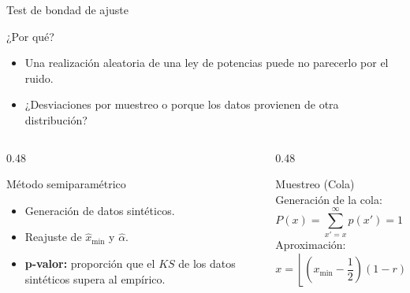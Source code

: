 \documentclass[aspectratio=169, 11pt, xcolor=table]{beamer}
\begin{document}
	\begin{frame}{Test de bondad de ajuste}
		\begin{block}{¿Por qué?}
			\begin{itemize}
				\item Una realización aleatoria de una ley de potencias puede no parecerlo por el ruido.
				\item ¿Desviaciones por muestreo o porque los datos provienen de otra distribución?
			\end{itemize}
		\end{block}
		
		\vspace{-0.2cm}
		
		\begin{columns}[T]
			\begin{column}{0.48\textwidth}
				\begin{exampleblock}{Método semiparamétrico}
					\begin{itemize}
						\item Generación de datos sintéticos.
						\item Reajuste de $\hat{x}_{\min}$ y $\hat{\alpha}$.
						\item \textbf{p-valor:} proporción que el $KS$ de los datos sintéticos supera al empírico.
					\end{itemize}
				\end{exampleblock}
			\end{column}
			
			\begin{column}{0.48\textwidth}
				\begin{alertblock}{Muestreo (Cola)}
					Generación de la cola:
					\begin{equation*}
					P(x) = \sum_{x'=x}^{\infty} p(x') = 1 - r
					\end{equation*}
					Aproximación:
					\begin{equation*}
					x = \left\lfloor \left(x_{\min} - \frac{1}{2}\right) (1 - r)^{-\frac{1}{\alpha-1}} + \frac{1}{2} \right\rfloor
					\end{equation*}
				\end{alertblock}
			\end{column}
		\end{columns}
	\end{frame}
	
\end{document}

